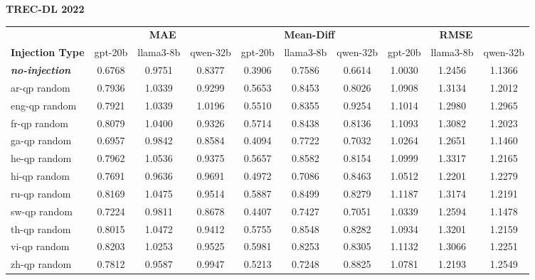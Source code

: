 \begin{table}[t]
\textbf{TREC-DL 2022} \\
\vspace{0.2em}
\begin{tabular}{lccccccccc}
\toprule
 & \multicolumn{3}{c}{\textbf{MAE}} & \multicolumn{3}{c}{\textbf{Mean-Diff}} & \multicolumn{3}{c}{\textbf{RMSE}} \\
\cmidrule(lr){2-4} \cmidrule(lr){5-7} \cmidrule(lr){8-10}
\textbf{Injection Type} & gpt-20b & llama3-8b & qwen-32b & gpt-20b & llama3-8b & qwen-32b & gpt-20b & llama3-8b & qwen-32b \\
\midrule
\textbf{\textit{no-injection}} & 0.6768 & 0.9751 & 0.8377 & 0.3906 & 0.7586 & 0.6614 & 1.0030 & 1.2456 & 1.1366 \\
ar-qp random & 0.7936 & 1.0339 & 0.9299 & 0.5653 & 0.8453 & 0.8026 & 1.0908 & 1.3134 & 1.2012 \\
eng-qp random & 0.7921 & 1.0339 & 1.0196 & 0.5510 & 0.8355 & 0.9254 & 1.1014 & 1.2980 & 1.2965 \\
fr-qp random & 0.8079 & 1.0400 & 0.9326 & 0.5714 & 0.8438 & 0.8136 & 1.1093 & 1.3082 & 1.2023 \\
ga-qp random & 0.6957 & 0.9842 & 0.8584 & 0.4094 & 0.7722 & 0.7032 & 1.0264 & 1.2651 & 1.1460 \\
he-qp random & 0.7962 & 1.0536 & 0.9375 & 0.5657 & 0.8582 & 0.8154 & 1.0999 & 1.3317 & 1.2165 \\
hi-qp random & 0.7691 & 0.9636 & 0.9691 & 0.4972 & 0.7086 & 0.8463 & 1.0512 & 1.2201 & 1.2279 \\
ru-qp random & 0.8169 & 1.0475 & 0.9514 & 0.5887 & 0.8499 & 0.8279 & 1.1187 & 1.3174 & 1.2191 \\
sw-qp random & 0.7224 & 0.9811 & 0.8678 & 0.4407 & 0.7427 & 0.7051 & 1.0339 & 1.2594 & 1.1478 \\
th-qp random & 0.8015 & 1.0472 & 0.9412 & 0.5755 & 0.8548 & 0.8282 & 1.0934 & 1.3201 & 1.2159 \\
vi-qp random & 0.8203 & 1.0253 & 0.9525 & 0.5981 & 0.8253 & 0.8305 & 1.1132 & 1.3066 & 1.2251 \\
zh-qp random & 0.7812 & 0.9587 & 0.9947 & 0.5213 & 0.7248 & 0.8825 & 1.0781 & 1.2193 & 1.2549 \\
\bottomrule
\end{tabular}
\end{table}